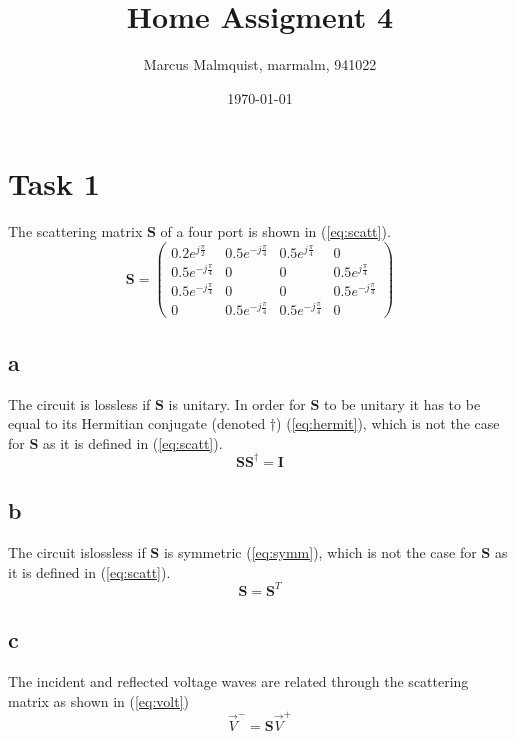 \documentclass{article}
\title{Home Assigment 4}
\author{Marcus Malmquist, marmalm, 941022}
\date{\today}
\begin{document}
\maketitle

\section{Task 1}\label{sec:1}
The scattering matrix $\mathbf{S}$ of a four port is shown in (\ref{eq:scatt}).
\begin{equation}
  \mathbf{S} =
  \begin{pmatrix}
    0.2e^{j\frac{\pi}{2}} & 0.5e^{-j\frac{\pi}{4}} & 0.5e^{j\frac{\pi}{4}} & 0 \\
    0.5e^{-j\frac{\pi}{4}} & 0 & 0 & 0.5e^{j\frac{\pi}{4}} \\
    0.5e^{-j\frac{\pi}{4}} & 0 & 0 & 0.5e^{-j\frac{\pi}{4}} \\
    0 & 0.5e^{-j\frac{\pi}{4}} & 0.5e^{-j\frac{\pi}{4}} & 0
  \end{pmatrix}
  \label{eq:scatt}
\end{equation}

\subsection{a}\label{sec:1a}
The circuit is lossless if $\mathbf{S}$ is unitary. In order for $\mathbf{S}$ to be unitary it has to be equal to its Hermitian conjugate (denoted $\dagger$) (\ref{eq:hermit}), which is not the case for $\mathbf{S}$ as it is defined in (\ref{eq:scatt}).
\begin{equation}
  \mathbf{S}\mathbf{S}^\dagger=\mathbf{I}
  \label{eq:hermit}
\end{equation}

\subsection{b}\label{sec:1b}
The circuit islossless if $\mathbf{S}$ is symmetric (\ref{eq:symm}), which is not the case for $\mathbf{S}$ as it is defined in (\ref{eq:scatt}).
\begin{equation}
  \mathbf{S}=\mathbf{S}^T
  \label{eq:symm}
\end{equation}

\subsection{c}\label{sec:1c}
The incident and reflected voltage waves are related through the scattering matrix as shown in (\ref{eq:volt})
\begin{equation}
  \vec{V}^{-}=\mathbf{S}\vec{V}^{+}
  \label{eq:volt}
\end{equation}
\end{document}
